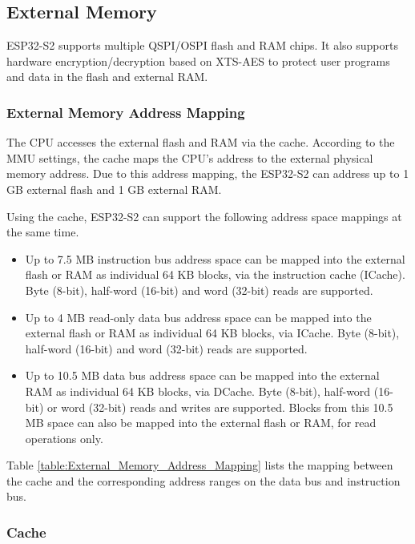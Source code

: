 \documentclass[main\_\_EN.tex]{subfiles}
\begin{document}
\subsection{External Memory} \label{para:external_Memory}

ESP32-S2 supports multiple QSPI/OSPI flash and RAM chips. It also supports hardware encryption/decryption based on XTS-AES to protect user programs and data in the flash and external RAM.

\subsubsection{External Memory Address Mapping}

The CPU accesses the external flash and RAM via the cache. According to the MMU settings, the cache maps the CPU’s address to the external physical memory address. Due to this address mapping, the ESP32-S2 can address up to 1 GB external flash and 1 GB external RAM.

Using the cache, ESP32-S2 can support the following address space mappings at the same time.
  \begin{itemize}
  \item  Up to 7.5 MB instruction bus address space can be mapped into the external flash or RAM as individual 64 KB blocks, via the instruction cache (ICache). Byte (8-bit), half-word (16-bit) and word (32-bit) reads are supported.

  \item  Up to 4 MB read-only data bus address space can be mapped into the external flash or RAM as individual 64 KB blocks, via ICache. Byte (8-bit), half-word (16-bit) and word (32-bit) reads are supported.

  \item Up to 10.5 MB data bus address space can be mapped into the external RAM as individual 64 KB blocks, via DCache. Byte (8-bit), half-word (16-bit) or word (32-bit) reads and writes are supported. Blocks from this 10.5 MB space can also be mapped into the external flash or RAM, for read operations only.
\end{itemize}

Table \ref{table:External_Memory_Address_Mapping} lists the mapping between the cache and the corresponding address ranges on the data bus and instruction bus.




\subsubsection{Cache}
\end{document}
